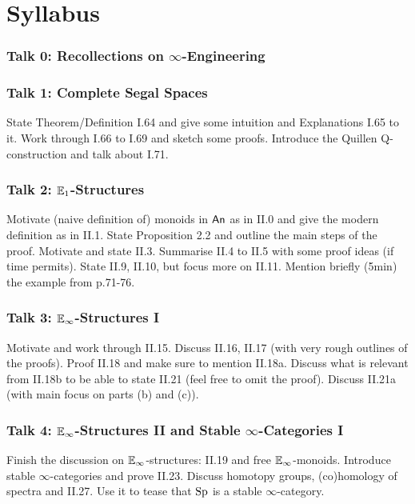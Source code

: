 \documentclass{article}
\begin{document}
\section*{Syllabus}

\subsubsection*{Talk 0: Recollections on $\infty$-Engineering}


\subsubsection*{Talk 1: Complete Segal Spaces}
State Theorem/Definition I.64 and give some intuition and
Explanations I.65 to it.
Work through I.66 to I.69 and sketch some proofs.
Introduce the Quillen Q-construction and talk about I.71.

\subsubsection*{Talk 2: $\mathbb{E}_1$-Structures}
Motivate (naive definition of) monoids in $\operatorname{\mathsf{An}}$ as in II.0 and
give the modern definition as in II.1. State Proposition 2.2 and 
outline the main steps of the proof.
Motivate and state II.3. Summarise II.4 to II.5 with some proof ideas
(if time permits). State II.9, II.10, but focus more on II.11.
Mention briefly (5min) the example from p.71-76.


\subsubsection*{Talk 3: $\mathbb{E}_\infty$-Structures I}
Motivate and work through II.15. Discuss II.16, II.17 (with very rough outlines
of the proofs). Proof II.18 and make sure to mention II.18a.
Discuss what is relevant from II.18b to be able to state II.21
(feel free to omit the proof). Discuss II.21a (with main focus on parts 
(b) and (c)).

\subsubsection*{Talk 4: $\mathbb{E}_\infty$-Structures II and 
Stable $\infty$-Categories I}
Finish the discussion on $\mathbb{E}_\infty$-structures: II.19 and free 
$\mathbb{E}_\infty$-monoids.
Introduce stable $\infty$-categories and prove II.23. Discuss
homotopy groups, (co)homology of spectra and II.27. Use it to 
tease that $\mathrm{Sp}$ is a stable $\infty$-category.
\end{document}
